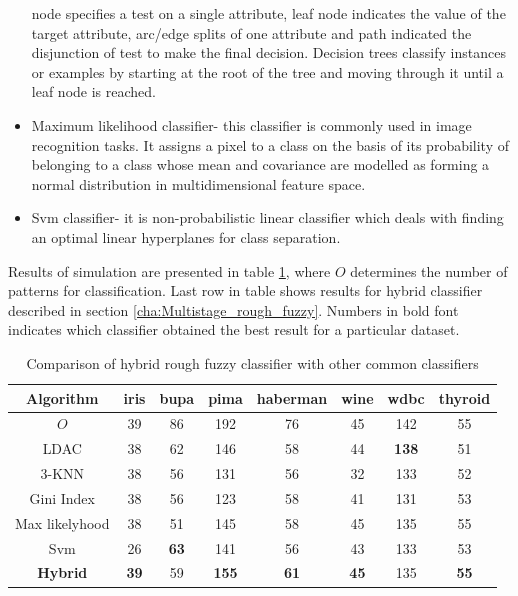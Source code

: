 \begin{itemize}
        node specifies a test on a single attribute, leaf node indicates the
        value of the target attribute, arc/edge splits of one attribute and
        path indicated the disjunction of test to make the final decision. 
        Decision trees classify instances or examples by starting at the root 
        of the tree and moving through it until a leaf node is reached.
    \item Maximum likelihood classifier- this classifier is commonly used in
        image recognition tasks. It assigns a pixel to a class on the basis of
        its probability of belonging to a class whose mean and covariance are
        modelled as forming a normal distribution in multidimensional feature
        space.
    \item Svm classifier- it is non-probabilistic linear classifier which 
        deals with finding an optimal linear hyperplanes for class separation.
\end{itemize}
Results of simulation are presented in table \ref{tab:final_comparison}, where
$O$ determines the number of patterns for classification. Last row in table
shows results for hybrid classifier described in section
\ref{cha:Multistage_rough_fuzzy}. Numbers in bold font indicates which
classifier obtained the best result for a particular dataset.

\begin{table}[H]
    \caption{Comparison of hybrid rough fuzzy classifier with other common
    classifiers}
    \centering
    \begin{tabular}{|c|c|c|c|c|c|c|c|}
        \hline
        Algorithm&iris&bupa&pima&haberman&wine&wdbc&thyroid \\ \hline \hline
        $O$&39&86&192&76&45 & 142 & 55\\ \hline
        LDAC&38&62&146&58&44& \textbf{138} &51 \\ \hline
        3-KNN&38&56&131&56&32 & 133 &52 \\ \hline
        Gini Index&38&56&123&58&41& 131 &53 \\ \hline
        Max likelyhood&38&51&145&58&45 & 135 &55\\ \hline 
        Svm&26&\textbf{63}&141&56&43& 133 & 53\\ \hline \hline
        \textbf{Hybrid}&\textbf{39}&59&\textbf{155}&\textbf{61}&\textbf{45}&
        135 & \textbf{55}\\ \hline
    \end{tabular}
    \label{tab:final_comparison}
\end{table}

